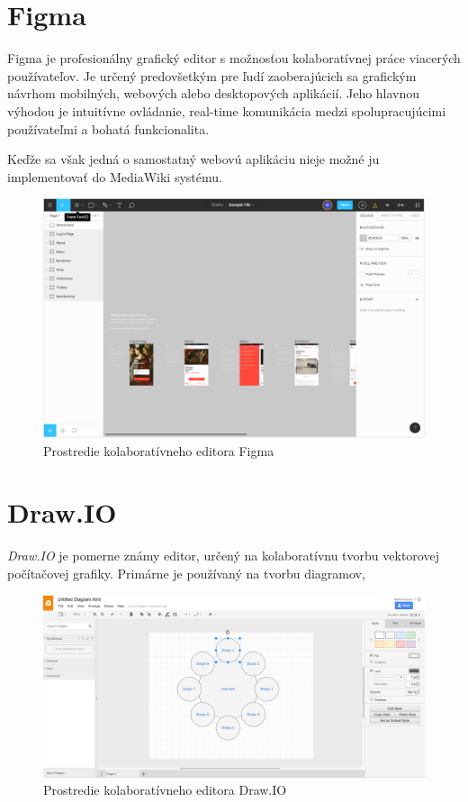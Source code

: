 \section{Figma}

Figma je profesionálny grafický editor s možnosťou kolaboratívnej práce viacerých používateľov. Je určený predovšetkým pre ľudí zaoberajúcich sa grafickým návrhom mobilných, webových alebo desktopových aplikácií. Jeho hlavnou výhodou je intuitívne ovládanie, real-time komunikácia medzi spolupracujúcimi používateľmi a bohatá funkcionalita. 

Keďže sa však jedná o samostatný webovú aplikáciu nieje možné ju implementovať do MediaWiki systému.

\begin{figure}[h]
	\centerline{\includegraphics[width=1\textwidth]{images/figma}}
	\caption[Editor Figma]{Prostredie kolaboratívneho editora Figma}
	\label{obr:Figma}
\end{figure}
\FloatBarrier

\section{Draw.IO}
\textit{Draw.IO} je pomerne známy editor, určený na kolaboratívnu tvorbu vektorovej počítačovej grafiky. Primárne je používaný na tvorbu diagramov, 


\begin{figure}[h]
	\centerline{\includegraphics[width=1\textwidth]{images/drawio}}
	\caption[Editor Draw.IO]{Prostredie kolaboratívneho editora Draw.IO}
	\label{obr:DrawIO}
\end{figure}
\FloatBarrier